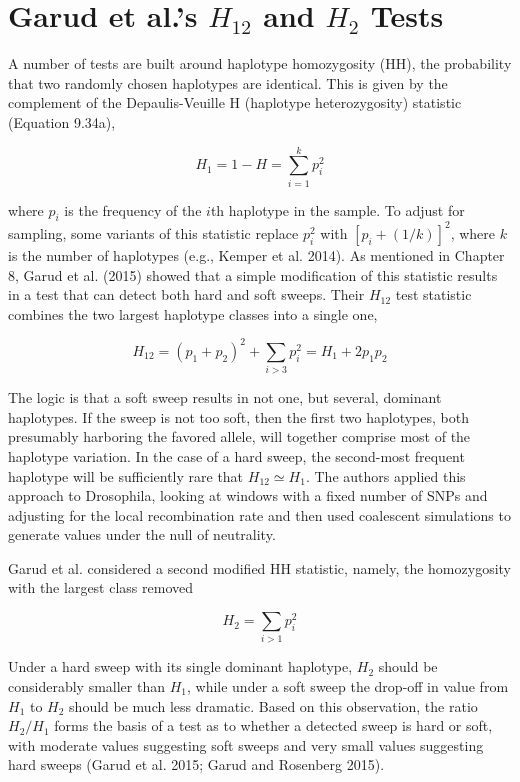 \documentclass{article}
\begin{document}
\section{Garud et al.'s  $ H_{12} $ and  $ H_{2} $ Tests}
A number of tests are built around haplotype homozygosity (HH), the probability that two randomly chosen haplotypes are identical. This is given by the complement of the Depaulis-Veuille H (haplotype heterozygosity) statistic (Equation 9.34a),

\begin{equation}
H_{1}=1-H=\sum_{i=1}^{k}p_{i}^{2}
\tag{9.35a}
\label{eq:9_35a}
\end{equation}

where  $ p_i $ is the frequency of the  $ i $th haplotype in the sample. To adjust for sampling, some variants of this statistic replace  $ p_i^2 $ with  $ [p_i + (1/k)]^2 $, where  $ k $ is the number of haplotypes (e.g., Kemper et al. 2014). As mentioned in Chapter 8, Garud et al. (2015) showed that a simple modification of this statistic results in a test that can detect both hard and soft sweeps. Their  $ H_{12} $ test statistic combines the two largest haplotype classes into a single one,

\begin{equation}
H_{12}=(p_{1}+p_{2})^{2}+\sum_{i>3}p_{i}^{2}=H_{1}+2p_{1}p_{2}
\tag{9.35b}
\label{eq:9_35b}
\end{equation}

The logic is that a soft sweep results in not one, but several, dominant haplotypes. If the sweep is not too soft, then the first two haplotypes, both presumably harboring the favored allele, will together comprise most of the haplotype variation. In the case of a hard sweep, the second-most frequent haplotype will be sufficiently rare that  $ H_{12} \simeq H_{1} $. The authors applied this approach to Drosophila, looking at windows with a fixed number of SNPs and adjusting for the local recombination rate and then used coalescent simulations to generate values under the null of neutrality.

Garud et al. considered a second modified HH statistic, namely, the homozygosity with the largest class removed

\begin{equation}
H_{2}=\sum_{i>1}p_{i}^{2}
\tag{9.35c}
\label{eq:9_35c}
\end{equation}

Under a hard sweep with its single dominant haplotype,  $ H_{2} $ should be considerably smaller than  $ H_{1} $, while under a soft sweep the drop-off in value from  $ H_{1} $ to  $ H_{2} $ should be much less dramatic. Based on this observation, the ratio  $ H_{2}/H_{1} $ forms the basis of a test as to whether a detected sweep is hard or soft, with moderate values suggesting soft sweeps and very small values suggesting hard sweeps (Garud et al. 2015; Garud and Rosenberg 2015).
\end{document}
